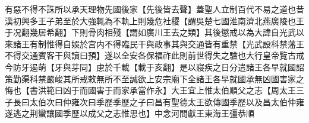有惡不得不誅所以承天理物先國後家【先後皆去聲】蓋聖人立制百代不易之道也昔漢初興多王子弟至於大強輒為不軌上則幾危社稷【謂吳楚七國淮南濟北燕廣陵也王于况翻幾居希翻】下則骨肉相殘【謂如廣川王去之類】其後懲戒以為大諱自光武以來諸王有制惟得自娛於宫内不得臨民干與政事其與交通皆有重禁【光武設科禁藩王不得交通賓客干與讀曰預】遂以全安各保福祚此則前世得失之驗也大行皇帝覽古戒今防牙遏萌【牙與芽同】慮於千載【載于亥翻】是以寢疾之日分遣諸王各早就國詔策勤渠科禁嚴峻其所戒敕無所不至誠欲上安宗廟下全諸王各早就國承無凶國害家之悔也【書洪範曰凶于而國害于而家承當作永】大王宜上惟太伯順父之志【周太王三子長曰太伯次曰仲雍次曰季歷季歷之子曰昌有聖德太王欲傳國季歷以及昌太伯仲雍遂逃之荆蠻讓國季歷以成父之志惟思也】中念河間獻王東海王彊恭順
